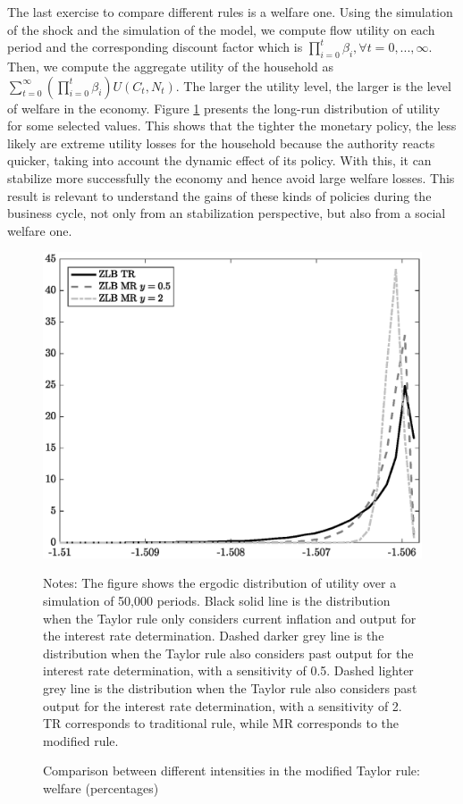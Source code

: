 \documentclass[11pt]{article}
\numberwithin{equation}{section}
\begin{document}
The last exercise to compare different rules is a welfare one. Using the simulation of the shock and the simulation of the model, we compute flow utility on each period and the corresponding discount factor which is $\prod_{i=0}^t\beta_i, \forall t=0,...,\infty$. Then, we compute the aggregate utility of the household as $\sum_{t=0}^{\infty}(\prod_{i=0}^t\beta_i)U(C_t,N_t)$. The larger the utility level, the larger is the level of welfare in the economy. Figure \ref{fig:welfare} presents the long-run distribution of utility for some selected values. This shows that the tighter the monetary policy, the less likely are extreme utility losses for the household because the authority reacts quicker, taking into account the dynamic effect of its policy. With this, it can stabilize more successfully the economy and hence avoid large welfare losses. This result is relevant to understand the gains of these kinds of policies during the business cycle, not only from an stabilization perspective, but also from a social welfare one.

%

\begin{figure}[H]
	\centering
	\caption{Comparison between different intensities in the modified Taylor rule: welfare (percentages)}\label{fig:welfare}
	\includegraphics[scale=.57]{welfare}
	\begin{minipage}{\linewidth}
    	\vspace{1mm}
		\footnotesize{{\sc Notes:} The figure shows the ergodic distribution of utility over a simulation of 50,000 periods. Black solid line is the distribution when the Taylor rule only considers current inflation and output for the interest rate determination. Dashed darker grey line is the distribution when the Taylor rule also considers past output for the interest rate determination, with a sensitivity of 0.5. Dashed lighter grey line is the distribution when the Taylor rule also considers past output for the interest rate determination, with a sensitivity of 2. TR corresponds to traditional rule, while MR corresponds to the modified rule.}
	\end{minipage}
\end{figure}
\end{document}
